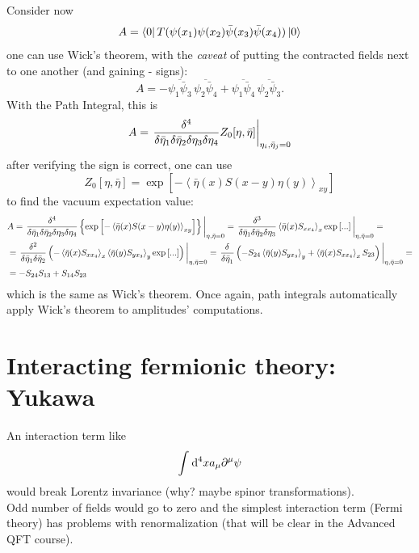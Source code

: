 \newpage
{}
Consider now
\[
    A=\bra{0}T(\psi(x_1)\psi(x_2)\bar\psi(x_3)\bar\psi(x_4))\ket{0}
\]
one can use Wick's theorem, with the \textit{caveat} of putting the contracted
fields next to one another (and gaining - signs):
\[
    A=-\overline{\psi_1\bar\psi_3}\,\overline{\psi_2\bar\psi_4} +
    \overline{\psi_1\bar\psi_4}\,\overline{\psi_2\bar\psi_3}.
\]
With the Path Integral, this is
\[
    A = \eval{\frac{\delta^4}{\delta\bar\eta_1\delta\bar\eta_2\delta\eta_3
    \delta\eta_4}Z_0[\eta,\bar\eta]}_{\eta_i,\bar\eta_j = 0}
\]
after verifying the sign is correct, one can use
\[
    Z_0[\eta,\bar\eta] = \exp\left[ -\left\langle \bar\eta(x)S(x-y)\eta(y)
    \right\rangle_{xy}\right]
\]
to find the vacuum expectation value:
    \begin{align*}
        &A=\eval{\frac{\delta^4}{\delta\bar\eta_1\delta\bar\eta_2\delta\eta_3
        \delta\eta_4}\left\{\exp\left[ -\left\langle \bar\eta(x)S(x-y)\eta(y)
        \right\rangle_{xy}\right]\right\}}_{\eta,\bar\eta=0}=
        \eval{\frac{\delta^3}{\delta\bar\eta_1\delta\bar\eta_2\delta\eta_3}
        \left\langle \bar\eta(x)S_{xx_4}\right\rangle_x \exp\left[ ... \right]
        }_{\eta,\bar\eta=0}=\\
        &=\eval{\frac{\delta^2}{\delta\bar\eta_1\delta\bar\eta_2}
        \left(-\left\langle \bar\eta(x)S_{xx_4}\right\rangle_x\left\langle
        \bar\eta(y)S_{yx_3}\right\rangle_y\exp\left[ ... \right]\right)}_{
        \eta,\bar\eta=0}=
        \eval{\fdv[]{}{\bar\eta_1}\left(-S_{24}\left\langle \bar\eta(y)S_{yx_3}
        \right\rangle_y+\left\langle \bar\eta(x)S_{xx_4}\right\rangle_xS_{23}
        \right)}_{\eta,\bar\eta=0}=\\
        & =-S_{24}S_{13}+S_{14}S_{23}
    \end{align*}
    which is the same as Wick's theorem. Once again, path integrals automatically
    apply Wick's theorem to amplitudes' computations.
    
\section{Interacting fermionic theory: Yukawa}
An interaction term like
\[
    \int_{}^{} \dd^4x a_\mu\partial^\mu\psi
\]
would break Lorentz invariance (why? maybe spinor transformations).\\
Odd number of fields would go to zero and the simplest interaction term
(Fermi theory) has problems with renormalization (that will be clear in the
Advanced QFT course).

